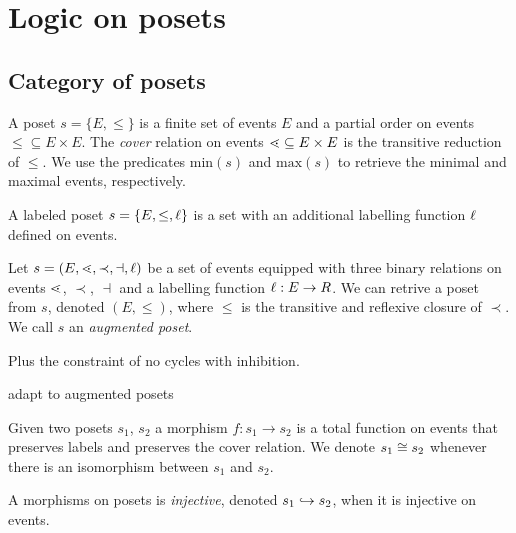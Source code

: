 \section{Logic on posets}

\subsection{Category of posets}
\label{sec:posets}

\begin{definition}[Poset]
  \label{def:poset}
  A poset $s=\{E,\leq\}$ is a finite set of events $E$ and a partial order on events $\leq\subseteq E\times E$. The \emph{cover} relation on events $\lessdot\subseteq E\times E$ is the transitive reduction of $\leq$.
  We use the predicates $\text{min}(s)$ and $\text{max}(s)$ to retrieve the minimal and maximal events, respectively.

  A labeled poset $s=\{E,\leq,\ell\}$ is a set with an additional labelling function $\ell$ defined on events.
\end{definition}

\begin{definition}
  Let $s=(E,\lessdot,\prec,\dashv,\ell)$ be a set of events equipped with three binary relations on events $\lessdot$, $\prec$, $\dashv$ and a labelling function $\ell:E\to R$. We can retrive a poset from $s$, denoted $(E,\leq)$, where $\leq$ is the transitive and reflexive closure of $\prec$.
  We call $s$ an \emph{augmented poset}.

  Plus the constraint of no cycles with inhibition.


\end{definition}

\begin{mdframed}[backgroundcolor=blue!20]
  adapt to augmented posets
\end{mdframed}

\begin{definition}
  Given two posets $s_1$, $s_2$ a morphism $f:s_1\to s_2$ is a total function on events that preserves labels and preserves the cover relation. We denote $s_1\cong s_2$ whenever there is an isomorphism between $s_1$ and $s_2$.

  A morphisms on posets is \emph{injective}, denoted $s_1\hookrightarrow s_2$, when it is injective on events.
\end{definition}

